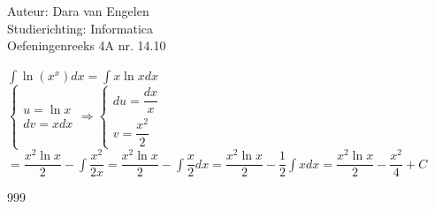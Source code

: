 \documentclass[a4paper]{article}
\begin{document}
  
\noindent \large Auteur: Dara van Engelen        \\
\noindent \large Studierichting: Informatica \\
\noindent \large Oefeningenreeks 4A nr. 14.10  \\

\medskip

\normalsize
$\displaystyle\int \ln(x^x) dx = \displaystyle\int x\ln x dx$\\

$\left\{\begin{array}{l}u=\ln x \\ dv = xdx \end{array} \Rightarrow \left\{\begin{array}{l}d u= \dfrac{dx}{x} \\ v=\dfrac{x^2}{2}\end{array}\right.\right.$\\

$= \dfrac{x^2 \ln x}{2} - \displaystyle\int \dfrac{x^2}{2x} = \dfrac{x^2 \ln x}{2} - \displaystyle\int \dfrac{x}{2}dx = \dfrac{x^2 \ln x}{2} - \dfrac{1}{2} \displaystyle\int xdx = \dfrac{x^2 \ln x}{2} - \dfrac{x^2}{4} +  C $

\begin{thebibliography}{999}
\end{thebibliography}
\end{document}
